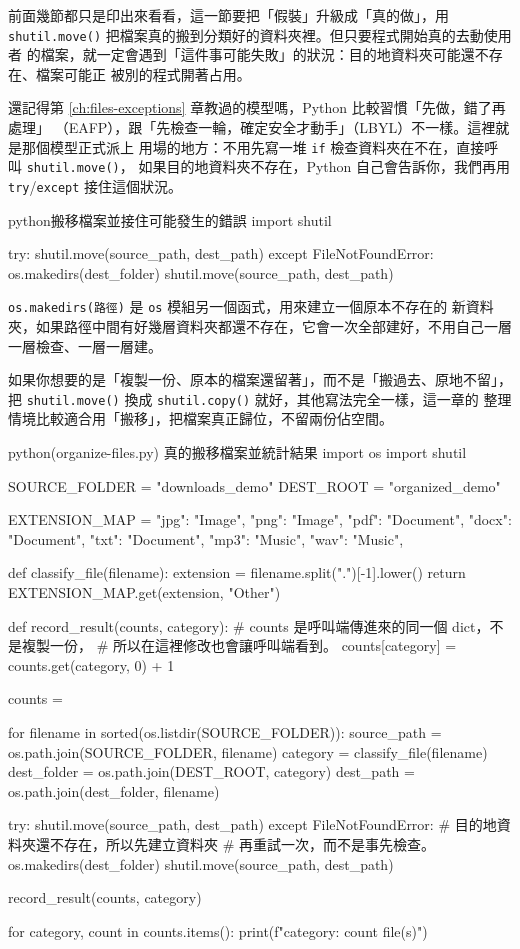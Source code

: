 前面幾節都只是印出來看看，這一節要把「假裝」升級成「真的做」，用
\texttt{shutil.move()} 把檔案真的搬到分類好的資料夾裡。但只要程式開始真的去動使用者
的檔案，就一定會遇到「這件事可能失敗」的狀況：目的地資料夾可能還不存在、檔案可能正
被別的程式開著占用。

還記得第 \ref{ch:files-exceptions} 章教過的模型嗎，Python 比較習慣「先做，錯了再處理」
（EAFP），跟「先檢查一輪，確定安全才動手」（LBYL）不一樣。這裡就是那個模型正式派上
用場的地方：不用先寫一堆 \texttt{if} 檢查資料夾在不在，直接呼叫 \texttt{shutil.move()}，
如果目的地資料夾不存在，Python 自己會告訴你，我們再用 \texttt{try}/\texttt{except}
接住這個狀況。

\begin{code}{python}{搬移檔案並接住可能發生的錯誤}
import shutil

try:
    shutil.move(source_path, dest_path)
except FileNotFoundError:
    os.makedirs(dest_folder)
    shutil.move(source_path, dest_path)
\end{code}

\texttt{os.makedirs(路徑)} 是 \texttt{os} 模組另一個函式，用來建立一個原本不存在的
新資料夾，如果路徑中間有好幾層資料夾都還不存在，它會一次全部建好，不用自己一層
一層檢查、一層一層建。

如果你想要的是「複製一份、原本的檔案還留著」，而不是「搬過去、原地不留」，把
\texttt{shutil.move()} 換成 \texttt{shutil.copy()} 就好，其他寫法完全一樣，這一章的
整理情境比較適合用「搬移」，把檔案真正歸位，不留兩份佔空間。

\begin{example}{python}{(organize-files.py) 真的搬移檔案並統計結果}
import os
import shutil

SOURCE_FOLDER = "downloads_demo"
DEST_ROOT = "organized_demo"

EXTENSION_MAP = {
    "jpg": "Image", "png": "Image",
    "pdf": "Document", "docx": "Document", "txt": "Document",
    "mp3": "Music", "wav": "Music",
}


def classify_file(filename):
    extension = filename.split(".")[-1].lower()
    return EXTENSION_MAP.get(extension, "Other")


def record_result(counts, category):
    # counts 是呼叫端傳進來的同一個 dict，不是複製一份，
    # 所以在這裡修改也會讓呼叫端看到。
    counts[category] = counts.get(category, 0) + 1


counts = {}

for filename in sorted(os.listdir(SOURCE_FOLDER)):
    source_path = os.path.join(SOURCE_FOLDER, filename)
    category = classify_file(filename)
    dest_folder = os.path.join(DEST_ROOT, category)
    dest_path = os.path.join(dest_folder, filename)

    try:
        shutil.move(source_path, dest_path)
    except FileNotFoundError:
        # 目的地資料夾還不存在，所以先建立資料夾
        # 再重試一次，而不是事先檢查。
        os.makedirs(dest_folder)
        shutil.move(source_path, dest_path)

    record_result(counts, category)

for category, count in counts.items():
    print(f"{category}: {count} file(s)")
\end{example}

